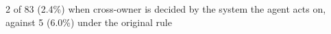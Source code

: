 2 of 83 (2.4\%) when cross-owner is decided by the system the agent acts on, against 5 (6.0\%) under the original rule